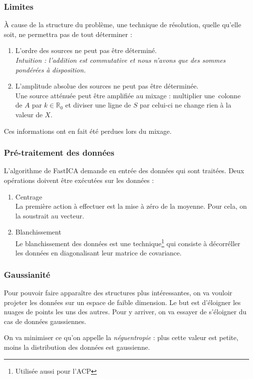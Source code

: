 \documentclass[compress]{beamer}
\newcommand{\esR}{\mathbb{R}}
\begin{document}
\begin{frame}
	\frametitle{Limites}
	À cause de la structure du problème, une technique de résolution,
	quelle qu'elle soit, ne permettra pas de tout déterminer :
	\pause
	\begin{enumerate}
	\item L'ordre des sources ne peut pas être déterminé.
	\pause
		\\\textit{Intuition : l'addition est commutative et nous n'avons que
			des sommes pondérées à disposition.}
	\pause
	\item L'amplitude absolue des sources ne peut pas être déterminée.
	\pause
		\\Une source atténuée peut être amplifiée au mixage :
			multiplier une~colonne de $A$ par $k\in\esR_0$ et
			diviser une ligne de $S$ par celui-ci ne change rien à
			la valeur de $X$.
	\pause
	\end{enumerate}

	Ces informations ont en fait été perdues lors du mixage.
\end{frame}
\begin{frame}
	\frametitle{Pré-traitement des données}
	L'algorithme de FastICA demande en entrée des données qui sont traitées.
	Deux opérations doivent être exécutées sur les données :
	\pause
	\begin{enumerate}
	\item Centrage
		\pause
			\\La première action à effectuer est la mise à zéro de la moyenne.
			Pour cela, on la soustrait au vecteur.
			\pause
	\item Blanchissement
		\pause
			\\Le blanchissement des données est une
			technique\footnote{Utilisée aussi pour l'ACP}
			qui consiste à décorréller les données en diagonalisant
			leur matrice de covariance.
	
	\end{enumerate}
\end{frame}
\begin{frame}
	\frametitle{Gaussianité}
	Pour pouvoir faire apparaître des structures plus intéressantes,
	on va vouloir projeter les données sur un espace de faible dimension.
	Le but est d'éloigner les nuages de points les uns des autres.
	Pour y arriver, on va essayer de s'éloigner du cas de données gaussiennes.
	\pause
	\vfill

	On va minimiser ce qu'on appelle la \textit{néguentropie} :
	plus cette valeur est petite, moins la distribution des données
	est gaussienne.
\end{frame}
\end{document}

